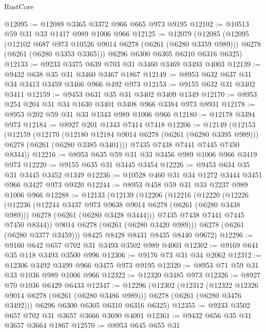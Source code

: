 \begin{lexlean}{RustCore}
\begin{coremodule}
@12095 := @12089 @3365 @3372 @966 @665 @973 @9195
@12102 := @10513 @59 @31 @33 @1417 @989 @1006 @966
@12125 := @12079
    (@12085
      (@12095
        (@12102 @687 @973 @10526 @9014 @6278 (@6261 (@6280 @3359 @989)))
        @6278
        (@6261 (@6280 @3353 @3365)))
      @6296
      @6300
      @6305
      @6310
      @6316
      @6325)
@12133 := @9233 @3375 @639 @703 @31 @3460 @3469 @3493 @4003
@12139 := @9432 @638 @35 @31 @3460 @3467 @1867
@12149 := @8953 @632 @637 @31 @34 @3413 @3459 @3466 @966 @492 @973
@12153 := @9155 @632 @31 @3402 @3411
@12159 := @9453 @631 @35 @31 @3402 @3409 @1349
@12170 := @8953 @254 @204 @31 @34 @1630 @3401 @3408 @966 @3384 @973 @8931
@12178 := @8953 @202 @59 @31 @33 @1343 @989 @1006 @966
@12180 := @12178 @3394 @973
@12184 := @8927 @201 @1343 @7414 @7418
@12206 := @12149
    (@12153
      (@12159
        (@12170
          (@12180 @12184 @9014 @6278 (@6261 (@6280 @3395 @989)))
          @6278
          (@6261 (@6280 @3385 @3401)))
        @7435
        @7438
        @7441
        @7445
        @7450
        @8344))
@12216 := @8953 @635 @59 @31 @33 @3456 @989 @1006 @966 @3419 @973
@12220 := @9155 @635 @31 @3445 @3454
@12226 := @9453 @634 @35 @31 @3445 @3452 @1349
@12236 := @10528 @460 @31 @34 @1272 @3444 @3451 @966 @3427 @973 @9320
@12244 := @8953 @458 @59 @31 @33 @2237 @989 @1006 @966
@12288 := @12133
    (@12139
      (@12206
        (@12216
          (@12220
            (@12226
              (@12236
                (@12244 @3437 @973 @9638 @9014 @6278 (@6261 (@6280 @3438 @989)))
                @6278
                (@6261 (@6280 @3428 @3444)))
              @7435
              @7438
              @7441
              @7445
              @7450
              @8344))
          @9014
          @6278
          (@6261 (@6280 @3420 @989)))
        @6278
        (@6261 (@6280 @3377 @3459)))
      @8425
      @8428
      @8431
      @8435
      @8440
      @9672)
@12296 := @9160 @642 @657 @702 @31 @3493 @3502 @989 @4003
@12302 := @9169 @641 @35 @118 @3493 @3500 @996
@12306 := @9176 @73 @31 @34 @2062
@12312 := @12306 @3492 @3499 @966 @3475 @973 @9195
@12320 := @8953 @71 @59 @31 @33 @1036 @989 @1006 @966
@12322 := @12320 @3485 @973
@12326 := @8927 @70 @1036 @6429 @6433
@12347 := @12296
    (@12302
      (@12312
        (@12322 @12326 @9014 @6278 (@6261 (@6280 @3486 @989)))
        @6278
        (@6261 (@6280 @3476 @3492)))
      @6296
      @6300
      @6305
      @6310
      @6316
      @6325)
@12355 := @9233 @3502 @657 @702 @31 @3657 @3666 @3690 @4001
@12361 := @9432 @656 @35 @31 @3657 @3664 @1867
@12570 := @8953
    @645
    @655
    @31

\end{coremodule}
\end{lexlean}
